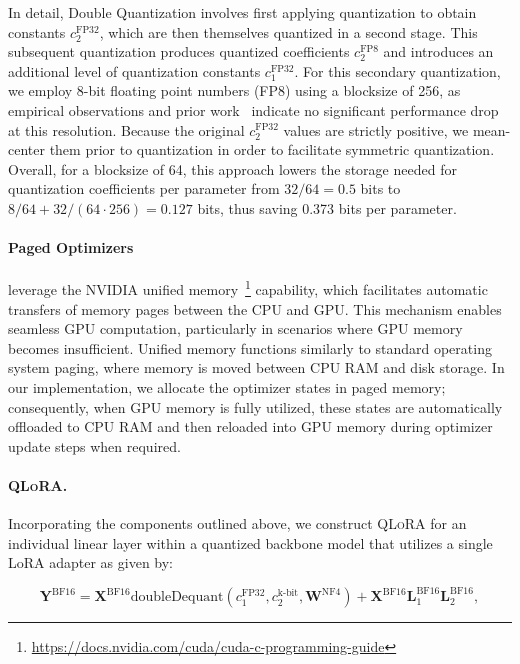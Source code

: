 In detail, Double Quantization involves first applying quantization to obtain constants $c_2^{\text{FP32}}$, which are then themselves quantized in a second stage. This subsequent quantization produces quantized coefficients $c_2^{\text{FP8}}$ and introduces an additional level of quantization constants $c_1^{\text{FP32}}$. For this secondary quantization, we employ 8-bit floating point numbers (FP8) using a blocksize of 256, as empirical observations and prior work~\citep{dettmers2022case} indicate no significant performance drop at this resolution. Because the original $c_2^{\text{FP32}}$ values are strictly positive, we mean-center them prior to quantization in order to facilitate symmetric quantization. Overall, for a blocksize of 64, this approach lowers the storage needed for quantization coefficients per parameter from $32/64 = 0.5$ bits to $8/64 + 32/(64\cdot256) = 0.127$ bits, thus saving 0.373 bits per parameter.

\paragraph{Paged Optimizers} leverage the NVIDIA unified memory~\footnote{\tiny \url{https://docs.nvidia.com/cuda/cuda-c-programming-guide}} capability, which facilitates automatic transfers of memory pages between the CPU and GPU. This mechanism enables seamless GPU computation, particularly in scenarios where GPU memory becomes insufficient. Unified memory functions similarly to standard operating system paging, where memory is moved between CPU RAM and disk storage. In our implementation, we allocate the optimizer states in paged memory; consequently, when GPU memory is fully utilized, these states are automatically offloaded to CPU RAM and then reloaded into GPU memory during optimizer update steps when required.

\paragraph{\textsc{QLoRA}.} Incorporating the components outlined above, we construct \textsc{QLoRA} for an individual linear layer within a quantized backbone model that utilizes a single LoRA adapter as given by:

\begin{equation}
    \mathbf{Y}^{\text{BF16}} =  \mathbf{X}^{\text{BF16}} \text{doubleDequant}(c_1^{\text{FP32}}, c_2^{\text{k-bit}}, \mathbf{W}^{\text{NF4}}) + \mathbf{X}^{\text{BF16}}\mathbf{L}^{\text{BF16}}_1\mathbf{L}^{\text{BF16}}_2,
\end{equation}

